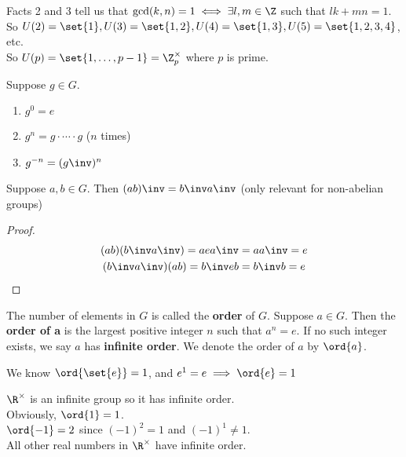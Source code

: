 \begin{example}
    Facts 2 and 3 tell us that $\gcd (k,n) = 1 \iff \exists l,m \in \Z$ such that $lk + mn = 1$. \\
    So $U(2) = \set{1}, U(3) = \set{1,2}, U(4) = \set{1, 3}, U(5) = \set{1,2,3,4}$, etc. \\
    So $U(p) = \set{1, \dots, p-1} = \Z_p^\times$ where $p$ is prime.
\end{example}

\begin{definition}[exponentiation]
    Suppose $g \in G$.
    \begin{enumerate}
        \item $g^0 = e$
        \item $g^n = g \cdot \cdots \cdot g$ ($n$ times)
        \item $g^{-n} = (g \inv)^n$
    \end{enumerate}
\end{definition}

\begin{theorem}
    Suppose $a,b \in G$. Then $(ab)\inv = b\inv a\inv$ (only relevant for non-abelian groups)
\end{theorem}
\begin{proof}
    \begin{align*}
        (ab)(b\inv a\inv) = aea\inv &= aa\inv = e \\
        (b\inv a\inv)(ab) = b\inv e b &= b\inv b = e
    \end{align*}
\end{proof}

\begin{definition}
    The number of elements in $G$ is called the \textbf{order} of $G$. Suppose $a \in G$. Then the \textbf{order of a} is the largest positive integer $n$ such that $a^n = e$. If no such integer exists, we say $a$ has \textbf{infinite order}. We denote the order of $a$ by $\ord{a}$.
\end{definition}

\begin{example}
    We know $\ord{\set{e}} = 1$, and $e^1 = e \implies \ord{e} = 1$
\end{example}

\begin{example}
    $\R^\times$ is an infinite group so it has infinite order. \\
    Obviously, $\ord{1} = 1$. \\
    $\ord{-1} = 2$ since $(-1)^2 = 1$ and $(-1)^1 \neq 1$. \\ 
    All other real numbers in $\R^\times$ have infinite order.
\end{example}

